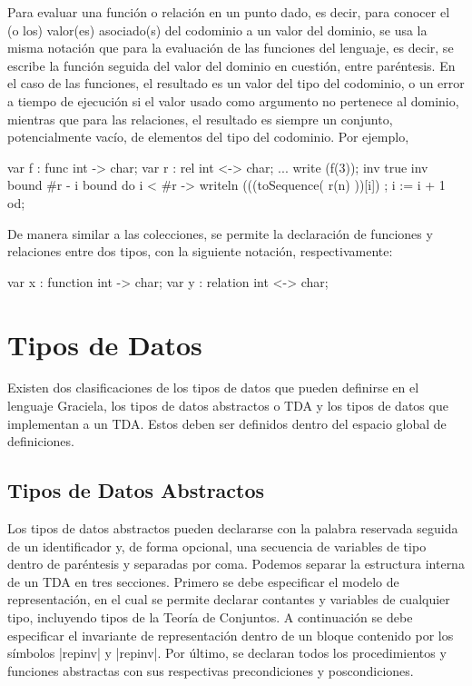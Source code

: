 Para evaluar una función o relación en un punto dado, es decir, para conocer el
(o los) valor(es) asociado(s) del codominio a un valor del dominio, se usa la
misma notación que para la evaluación de las funciones del lenguaje, es decir,
se escribe la función seguida del valor del dominio en cuestión, entre
paréntesis. En el caso de las funciones, el resultado es un valor del tipo del
codominio, o un error a tiempo de ejecución si el valor usado como argumento no
pertenece al dominio, mientras que para las relaciones, el resultado es siempre
un conjunto, potencialmente vacío, de elementos del tipo del codominio. Por
ejemplo,

\begin{gracielacode}
var f : func int -> char;
var r : rel int <-> char;
...
write (f(3));
{inv true inv}
{bound #r - i bound}
do i < #r -> writeln (((toSequence( r(n) ))[i])
           ; i := i + 1
od;
\end{gracielacode}

De manera similar a las colecciones, se permite la declaración de funciones y
relaciones entre dos tipos, con la siguiente notación, respectivamente:

\begin{gracielacode}
var x : function int -> char;
var y : relation int <-> char;
\end{gracielacode}

\section{Tipos de Datos}
Existen dos clasificaciones de los tipos de datos que pueden definirse en el
lenguaje Graciela, los tipos de datos abstractos o TDA y los tipos de datos
que implementan a un TDA. Estos deben ser definidos dentro del espacio global
de definiciones.

\subsection{Tipos de Datos Abstractos}

Los tipos de datos abstractos pueden declararse con la palabra reservada
 seguida de un identificador y, de forma opcional, una
secuencia de variables de tipo dentro de paréntesis y separadas por coma.
Podemos separar la estructura interna de un TDA en tres secciones. Primero se
debe especificar el modelo de representación, en el cual se permite declarar
contantes y variables de cualquier tipo, incluyendo tipos de la Teoría de
Conjuntos. A continuación se debe especificar el invariante de representación
dentro de un bloque contenido por los símbolos
\ingra|{repinv| y \ingra|repinv}|. Por último, se declaran todos los procedimientos y
funciones abstractas con sus respectivas precondiciones y poscondiciones.

